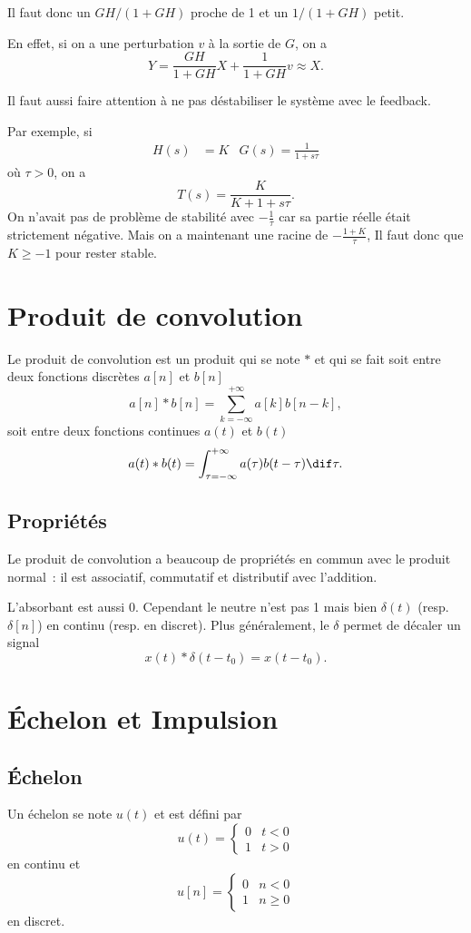 Il faut donc un $GH/(1+GH)$ proche de 1 et un $1/(1+GH)$ petit.

En effet, si on a une perturbation $v$ à la sortie de $G$, on a
\[ Y = \frac{GH}{1+GH}X + \frac{1}{1+GH}v \approx X. \]

Il faut aussi faire attention à ne pas déstabiliser le système avec
le feedback.

Par exemple, si
\begin{align*}
  H(s) & = K & G(s) = \frac{1}{1+s\tau}
\end{align*}
où $\tau > 0$, on a
\[ T(s) = \frac{K}{K + 1 + s\tau}. \]
On n'avait pas de problème de stabilité avec $-\frac{1}{\tau}$ car sa partie
réelle était strictement négative.
Mais on a maintenant une racine de $-\frac{1+K}{\tau}$,
Il faut donc que $K \geq -1$ pour rester stable.


\annexe
\section{Produit de convolution}
Le produit de convolution est un produit qui se note $*$ et qui se fait
soit entre deux fonctions discrètes $a[n]$ et $b[n]$
\[ a[n] * b[n] = \sum_{k=-\infty}^{+\infty} a[k]b[n-k], \]
soit entre deux fonctions continues $a(t)$ et $b(t)$
\[ a(t) * b(t) = \int_{\tau=-\infty}^{+\infty} a(\tau)b(t-\tau) \dif \tau. \]

\subsection{Propriétés}
Le produit de convolution a beaucoup de propriétés en commun avec le produit
normal~: il est associatif, commutatif et distributif avec l'addition.

L'absorbant est aussi 0. Cependant le neutre n'est pas 1 mais bien
$\delta(t)$ (resp. $\delta[n]$) en continu (resp. en discret).
Plus généralement, le $\delta$ permet de décaler un signal
\[ x(t) * \delta(t - t_0) = x(t - t_0). \]

\section{Échelon et Impulsion}
\subsection{Échelon}
Un échelon se note $u(t)$ et est défini par
\[ u(t) = \begin{cases}
    0 & t < 0\\
    1 & t > 0
\end{cases} \]
en continu et
\[ u[n] = \begin{cases}
    0 & n < 0\\
    1 & n \geq 0
\end{cases} \]
en discret.

